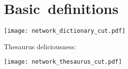 \section{Basic\ definitions}

\begin{frame}

  \begin{block}{}
    \texttt{[image: network\_dictionary\_cut.pdf]}
  \end{block}

\end{frame}

\begin{frame}

  \begin{block}{Thesaurus deliciousness:}
    \begin{center}
      \texttt{[image: network\_thesaurus\_cut.pdf]}
    \end{center}
  \end{block}

\end{frame}





